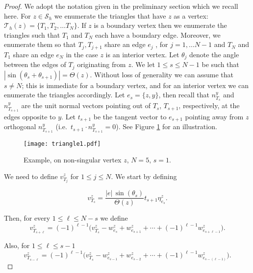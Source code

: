 \documentclass[11pt]{amsart}
\numberwithin{equation}{section}
\newcommand{\Sh}{\mathcal{S}_h}
\newcommand{\ra}[1]{\renewcommand{\arraystretch}{#1}}
\newcommand{\Th}{\mathcal{T}_h}
\theoremstyle{definition}
\begin{document}
\begin{proof}
We adopt the notation  given in the preliminary section which we recall here. 
For $z \in \Sh$ we enumerate the triangles that have $z$ as a vertex: $\Th(z)=\{ T_1, T_2, \ldots T_{N} \}$. 
If $z$ is a boundary vertex then we enumerate the triangles such that $T_1$ and  $T_N$ each have a boundary edge.  Moreover, we enumerate them so that $T_j, T_{j+1}$ share an edge  $e_j$ ,  for $j=1, \ldots N-1$ and  $T_{N}$ and $T_1$  share an edge $ e_{N}$ in the case $z$ is an interior vertex. Let $\theta_j $ denote the angle between the edges of $T_j$ originating from $z$.    We let $1 \le s \le N-1$ be such that $ |\sin(\theta_s+ \theta_{s+1})|=\Theta(z)$. 
Without loss of generality we can assume that $s \neq N$; this is immediate
for a boundary vertex, and for an interior vertex
 we can enumerate the triangles accordingly.
Let  $e_s=\{ z, y\}$, then recall that $n_{T_s}^y$ and $n_{T_{s+1}}^y$ are the unit normal vectors pointing out of $T_{s}$, $T_{s+1}$, respectively,  at the edges opposite to $y$. 
Let $t_{s+1}$ be the tangent vector to $e_{s+1}$ pointing 
away from  $z$ orthogonal $n_{T_{s+1}}^y$ (i.e.\, $ t_{s+1} \cdot n_{T_{s+1}}^y=0$). See Figure \ref{triangle1} for an illustration.

\begin{figure}
\vspace{-100pt}
\centerline{\qquad\qquad\texttt{[image: triangle1.pdf]}}
\footnotesize
\ra{1.1}
\vspace{-100pt}
\caption{Example, on non-singular vertex $z$, $N=5$, $s=1$.}
\label{triangle1}
\end{figure}

 We need to define $v_{T_j}^z$ for $1 \le j \le N$. We start by defining

\begin{equation*}
v_{T_{s}}^z= \frac{ |e| \, \sin(\theta_s)}{ \Theta(z)}   t_{s+1} \eta_{e_s}^z .
\end{equation*}

Then, for every $1 \le \ell \le N-s $ we define
\begin{equation*}
v_{T_{s+\ell}}^z= (-1)^ {\ell-1} \big(v_{T_{s}}^z- w_{e_{s}}^z+w_{e_{s+1}}^z+  \cdots+ (-1)^{\ell-1} w_{e_{s+ \ell-1}}^z\big).    
\end{equation*}

Also, for   $1 \le  \ell \le s-1$
\begin{equation*}
v_{T_{s-\ell}}^z= (-1)^ {\ell-1} \big(v_{T_{s}}^z- w_{e_{s-1}}^z+w_{e_{s-2}}^z+  \cdots+ (-1)^{\ell-1} w_{e_{s-(\ell -1)}}^z\big).    
\end{equation*}



\end{proof}
\end{document}
